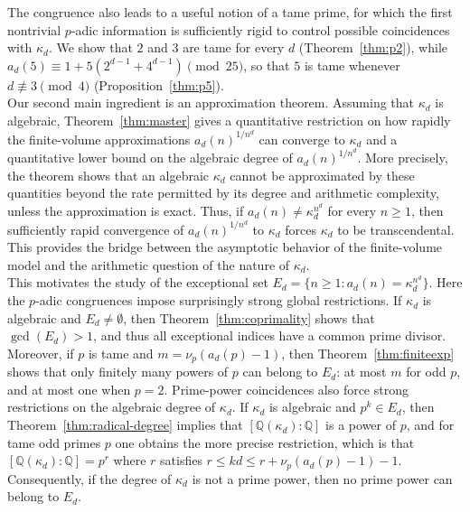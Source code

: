 \documentclass{article}
\theoremstyle{plain}
\theoremstyle{definition}
\theoremstyle{remark}
\begin{document}
The congruence also leads to a useful notion of a tame prime, for
which the first nontrivial $p$-adic information is sufficiently rigid to
control possible coincidences with $\kappa_d$. We show that $2$ and $3$ are
tame for every $d$ (Theorem~\ref{thm:p2}), while $a_d(5)\equiv1+5(2^{d-1}+4^{d-1})\pmod{25}$, so that $5$ is tame whenever $d\not\equiv3\pmod4$
(Proposition~\ref{thm:p5}).\\


Our second main ingredient is an approximation theorem. Assuming that
$\kappa_d$ is algebraic, Theorem~\ref{thm:master} gives a quantitative
restriction on how rapidly the finite-volume approximations $a_d(n)^{1/n^d}$ can converge to $\kappa_d$ and a quantitative lower bound on the algebraic degree of $a_d(n)^{1/n^d}$. More precisely, the theorem shows that an
algebraic $\kappa_d$ cannot be approximated by these quantities beyond the
rate permitted by its degree and arithmetic complexity, unless the
approximation is exact. Thus, if $a_d(n)\neq \kappa_d^{n^d}$ for every $n \geq 1$, then sufficiently rapid convergence of $a_d(n)^{1/n^d}$ to $\kappa_d$
forces $\kappa_d$ to be transcendental. This provides the bridge between
the asymptotic behavior of the finite-volume model and the arithmetic
question of the nature of $\kappa_d$.\\

This motivates the study of the exceptional set $E_d=\{n\geq1:a_d(n)=\kappa_d^{n^d}\}$. Here the $p$-adic congruences impose surprisingly strong global restrictions.
If $\kappa_d$ is algebraic and $E_d\neq\emptyset$, then
Theorem~\ref{thm:coprimality} shows that $\gcd(E_d)>1$, and thus all exceptional indices have a common prime divisor. Moreover, if $p$
is tame and $m=\nu_p(a_d(p)-1)$, then
Theorem~\ref{thm:finiteexp} shows that only finitely many powers of $p$ can
belong to $E_d$: at most $m$ for odd $p$, and at most one when $p=2$. Prime-power coincidences also force strong restrictions on the algebraic
degree of $\kappa_d$. If $\kappa_d$ is algebraic and $p^k\in E_d$, then
Theorem~\ref{thm:radical-degree} implies that $[\mathbb Q(\kappa_d):\mathbb Q]$ is a power of $p$, and for tame odd primes $p$ one obtains the more precise
restriction, which is that $[\mathbb Q(\kappa_d):\mathbb Q] = p^r$ where $r$ satisfies $r\leq kd\leq r+\nu_p(a_d(p)-1)-1$. Consequently, if the degree of $\kappa_d$ is not a prime power, then no
prime power can belong to $E_d$.\\
\end{document}
